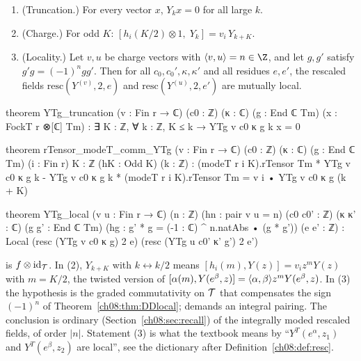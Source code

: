 \begin{theorem}\label{ch08:thm:YTg}
\begin{enumerate}
\item (Truncation.) For every vector $x$, $Y_k x=0$ for all large $k$.
\item (Charge.) For odd $K$: $[h_i(K/2)\otimes1,\;Y_k]=v_i\,Y_{k+K}$.
\item (Locality.) Let $v,u$ be charge vectors with $\cheightpair vu=n\in\Z$, and let $g,g'$ satisfy
  $g'g=(-1)^{n}gg'$.  Then for all $c_0,c_0',\kappa,\kappa'$ and all residues $e,e'$, the rescaled
  fields $\mathrm{resc}(Y^{(v)},2,e)$ and $\mathrm{resc}(Y^{(u)},2,e')$ are mutually local.
\end{enumerate}
\end{theorem}
\begin{leancode}
theorem YTg_truncation (v : Fin r → ℂ) (c0 : ℤ) (κ : ℂ) (g : End ℂ Tm)
    (x : FockT r ⊗[ℂ] Tm) : ∃ K : ℤ, ∀ k : ℤ, K ≤ k → YTg v c0 κ g k x = 0

theorem rTensor_modeT_comm_YTg (v : Fin r → ℂ) (c0 : ℤ) (κ : ℂ) (g : End ℂ Tm) (i : Fin r)
    {K : ℤ} (hK : Odd K) (k : ℤ) :
    (modeT r i K).rTensor Tm * YTg v c0 κ g k - YTg v c0 κ g k * (modeT r i K).rTensor Tm
      = v i • YTg v c0 κ g (k + K)

theorem YTg_local (v u : Fin r → ℂ) (n : ℤ) (hn : pair v u = n) (c0 c0' : ℤ) (κ κ' : ℂ)
    (g g' : End ℂ Tm) (hg : g' * g = (-1 : ℂ) ^ n.natAbs • (g * g')) (e e' : ℤ) :
    Local (resc (YTg v c0 κ g) 2 e) (resc (YTg u c0' κ' g') 2 e')
\end{leancode}
\begin{dictionary}
 is $f\otimes\mathrm{id}_{\mathcal{T}}$.  In (2), $Y_{k+K}$ with $k\leftrightarrow
k/2$ means $[h_i(m),Y(z)]=v_iz^mY(z)$ with $m=K/2$, the twisted version of
$[\alpha(m),Y(e^\beta,z)]=\langle \alpha,\beta\rangle z^mY(e^\beta,z)$.  In (3) the hypothesis
 is the graded commutativity on $\mathcal{T}$ that compensates the sign $(-1)^n$ of
Theorem~\ref{ch08:thm:DDlocal};  demands an integral pairing.  The conclusion is ordinary
 (Section~\ref{ch08:sec:recall}) of the integrally moded rescaled fields, of order
$|n|$.  Statement (3) is what the textbook means by ``$Y^T(e^\alpha,z_1)$ and $Y^T(e^\beta,z_2)$ are
local'', see the dictionary after Definition~\ref{ch08:def:resc}.
\end{dictionary}

